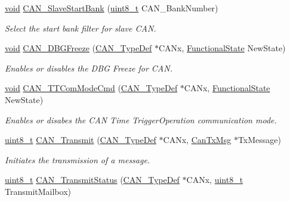 \begin{DoxyCompactItemize}
\hyperlink{usb__devapi_8h_afabf60e7f57651d6d595a02c75f07cd0}{void} \hyperlink{group___c_a_n___private___functions_ga109ff8960bc59f44b984c9646f17b3c0}{C\+A\+N\+\_\+\+Slave\+Start\+Bank} (\hyperlink{_p_e___types_8h_aba7bc1797add20fe3efdf37ced1182c5}{uint8\+\_\+t} C\+A\+N\+\_\+\+Bank\+Number)
\begin{DoxyCompactList}\small\item\em Select the start bank filter for slave C\+AN. \end{DoxyCompactList}\item 
\hyperlink{usb__devapi_8h_afabf60e7f57651d6d595a02c75f07cd0}{void} \hyperlink{group___c_a_n___private___functions_gac0e2d33e08caf49d1f1251f0dcc20213}{C\+A\+N\+\_\+\+D\+B\+G\+Freeze} (\hyperlink{struct_c_a_n___type_def}{C\+A\+N\+\_\+\+Type\+Def} $\ast$C\+A\+Nx, \hyperlink{agilefox_2library_2inc_2stm32f10x__type_8h_ac9a7e9a35d2513ec15c3b537aaa4fba1}{Functional\+State} New\+State)
\begin{DoxyCompactList}\small\item\em Enables or disables the D\+BG Freeze for C\+AN. \end{DoxyCompactList}\item 
\hyperlink{usb__devapi_8h_afabf60e7f57651d6d595a02c75f07cd0}{void} \hyperlink{group___c_a_n___private___functions_ga94740177bab153ca5b102d122f9a8cca}{C\+A\+N\+\_\+\+T\+T\+Com\+Mode\+Cmd} (\hyperlink{struct_c_a_n___type_def}{C\+A\+N\+\_\+\+Type\+Def} $\ast$C\+A\+Nx, \hyperlink{agilefox_2library_2inc_2stm32f10x__type_8h_ac9a7e9a35d2513ec15c3b537aaa4fba1}{Functional\+State} New\+State)
\begin{DoxyCompactList}\small\item\em Enables or disabes the C\+AN Time Trigger\+Operation communication mode. \end{DoxyCompactList}\item 
\hyperlink{_p_e___types_8h_aba7bc1797add20fe3efdf37ced1182c5}{uint8\+\_\+t} \hyperlink{group___c_a_n___private___functions_gaccfcb81f76f58400077c7b2d8641dd83}{C\+A\+N\+\_\+\+Transmit} (\hyperlink{struct_c_a_n___type_def}{C\+A\+N\+\_\+\+Type\+Def} $\ast$C\+A\+Nx, \hyperlink{struct_can_tx_msg}{Can\+Tx\+Msg} $\ast$Tx\+Message)
\begin{DoxyCompactList}\small\item\em Initiates the transmission of a message. \end{DoxyCompactList}\item 
\hyperlink{_p_e___types_8h_aba7bc1797add20fe3efdf37ced1182c5}{uint8\+\_\+t} \hyperlink{group___c_a_n___private___functions_ga68ab05a0a6cdfcc2b6f6b6b2c10848e2}{C\+A\+N\+\_\+\+Transmit\+Status} (\hyperlink{struct_c_a_n___type_def}{C\+A\+N\+\_\+\+Type\+Def} $\ast$C\+A\+Nx, \hyperlink{_p_e___types_8h_aba7bc1797add20fe3efdf37ced1182c5}{uint8\+\_\+t} Transmit\+Mailbox)

\end{DoxyCompactItemize}
